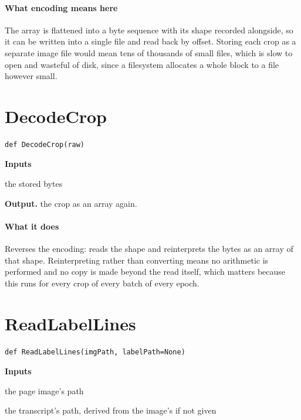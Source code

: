 \paragraph{What encoding means here}
The array is flattened into a byte sequence with its shape recorded alongside, so it can be written into a single file and read back by offset. Storing each crop as a separate image file would mean tens of thousands of small files, which is slow to open and wasteful of disk, since a filesystem allocates a whole block to a file however small.


\section{DecodeCrop}
\begin{lstlisting}[style=sig]
def DecodeCrop(raw)
\end{lstlisting}

\noindent\textbf{Inputs}
\begin{description}[leftmargin=2.2em,style=nextline,font=\normalfont\ttfamily]\setlength\itemsep{1pt}
  \item[{raw}] \normalfont the stored bytes
\end{description}

\noindent\textbf{Output.} the crop as an array again.


\paragraph{What it does}
Reverses the encoding: reads the shape and reinterprets the bytes as an array of that shape. Reinterpreting rather than converting means no arithmetic is performed and no copy is made beyond the read itself, which matters because this runs for every crop of every batch of every epoch.


\section{ReadLabelLines}
\begin{lstlisting}[style=sig]
def ReadLabelLines(imgPath, labelPath=None)
\end{lstlisting}

\noindent\textbf{Inputs}
\begin{description}[leftmargin=2.2em,style=nextline,font=\normalfont\ttfamily]\setlength\itemsep{1pt}
  \item[{imgPath}] \normalfont the page image's path
  \item[{labelPath}] \normalfont the transcript's path, derived from the image's if not given
\end{description}

